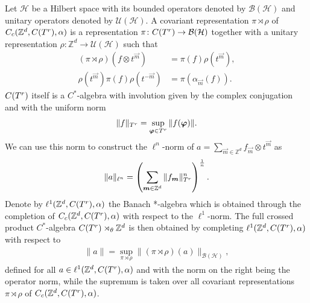 \documentclass[submission, Phys]{SciPost}
\begin{document}
Let $\mathcal{H}$ be a Hilbert space with its bounded operators denoted by $\mathcal{B}(\mathcal{H})$ and unitary operators denoted by $\mathcal{U}(\mathcal{H})$.
A covariant representation $\pi \rtimes \rho$ of $C_c(\mathbb{Z}^d, C(T^r), \alpha )$ is a representation $\pi \colon C(T^r) \to \mathcal{B}(\mathcal{H})$ together with a unitary representation $\rho\colon \mathbb{Z}^d \to \mathcal{U}(\mathcal{H})$ such that
\begin{align}
    (\pi\rtimes \rho) (f \otimes t^{\vec{m}} )  & = \pi(f) \rho(t^{\vec{m}}), \\
    \rho(t^{\vec{m}}) \pi(f) \rho(t^{-\vec{m}})&= \pi(\alpha_{\vec{m}}(f) ) .
\end{align}
$C(T^r)$ itself is a $C^\ast$-algebra with involution given by the complex conjugation and with the uniform norm
\begin{align}
    \| f \|_{T^r} = \sup_{\boldsymbol{\varphi} \in T^r}  \| f( \boldsymbol{\varphi} ) \|.
\end{align}
We can use this norm to construct the $\ell^n$-norm of $a = \sum_{\vec{m} \in \mathbb{Z}^d} f_{\vec{m}} \otimes t^{\vec{m}} $ as
\begin{align}
 \| a \|_{\ell^n}  =   \left(\sum_{\boldsymbol{m} \in \mathbb{Z}^d} \|  f_{\boldsymbol{m}} \|_{T^r}^n\right)^{\frac{1}{n}} .
\end{align}
Denote by $\ell^1(\mathbb{Z}^d, C(T^r), \alpha)$ the Banach *-algebra which is obtained through the completion of $C_c(\mathbb{Z}^d, C(T^r), \alpha )$ with respect to the $\ell^1$-norm.
The full crossed product $C^\ast$-algebra $C(T^r)\rtimes_\theta \mathbb{Z}^d$  is then obtained by completing $\ell^1(\mathbb{Z}^d,C(T^r), \alpha)$ with respect to 
\begin{align}
    \| a \| = \sup_{\pi \rtimes \rho} 
    \| (\pi \rtimes \rho)(a) \|_{\mathcal{B}(\mathcal{H})} ,
\end{align}
defined for all $a\in \ell^1(\mathbb{Z}^d,C(T^r), \alpha)$ and with the norm on the right being the operator norm, while the supremum is taken over all covariant representations $\pi \rtimes \rho$ of $C_c(\mathbb{Z}^d, C(T^r), \alpha )$.
\end{document}
